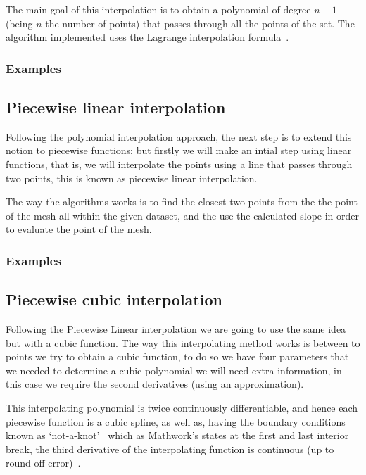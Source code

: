 The main goal of this interpolation is to obtain a polynomial of degree $n-1$ (being $n$ the number of points) that passes through all the points of the set. The algorithm implemented uses the Lagrange interpolation formula~\cite{mathworldLagrange}.
\subsubsection{Examples}
	


\subsection{Piecewise linear interpolation}
Following the polynomial interpolation approach, the next step is to extend this notion to piecewise functions; but firstly we will make an intial step using linear functions, that is, we will interpolate the points using a line that passes through two points, this is known as piecewise linear interpolation. 

The way the algorithms works is to find the closest two points from the the point of the mesh all within the given dataset, and the use the calculated slope in order to evaluate the point of the mesh.

\subsubsection{Examples}
	

\subsection{Piecewise cubic interpolation}
Following the Piecewise Linear interpolation we are going to use the same idea but with a cubic function. The way this interpolating method works is between to points we try to obtain a cubic function, to do so we have four parameters that we needed to determine a cubic polynomial we will need extra information, in this case we require the second derivatives (using an approximation). 

This interpolating polynomial is twice continuously differentiable, and hence each piecewise function is a cubic spline, as well as, having the boundary conditions known as `not-a-knot'~\cite{doi:10.1137/1.9780898717952} which as Mathwork's states at the first and last interior break, the third derivative of the interpolating function is continuous (up to round-off error)~\cite{notAknot}.


